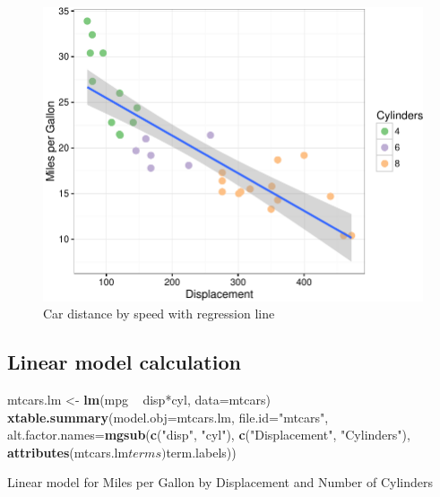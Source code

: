 \documentclass[]{article}
\newenvironment{Shaded}{\begin{snugshade}}{\end{snugshade}}
\newcommand{\KeywordTok}[1]{\textcolor[rgb]{0.13,0.29,0.53}{\textbf{{#1}}}}
\newcommand{\DataTypeTok}[1]{\textcolor[rgb]{0.13,0.29,0.53}{{#1}}}
\newcommand{\StringTok}[1]{\textcolor[rgb]{0.31,0.60,0.02}{{#1}}}
\newcommand{\NormalTok}[1]{{#1}}
\begin{document}
\begin{figure}[htbp]
\centering
\includegraphics{example_files/figure-latex/mtcars_plot-1.pdf}
\caption{Car distance by speed with regression line}
\end{figure}

\subsection{Linear model calculation}\label{linear-model-calculation}

\begin{Shaded}
\begin{Highlighting}[]
\NormalTok{mtcars.lm <-}\StringTok{ }\KeywordTok{lm}\NormalTok{(mpg ~}\StringTok{ }\NormalTok{disp*cyl, }\DataTypeTok{data=}\NormalTok{mtcars)}
\KeywordTok{xtable.summary}\NormalTok{(}\DataTypeTok{model.obj=}\NormalTok{mtcars.lm, }
               \DataTypeTok{file.id=}\StringTok{"mtcars"}\NormalTok{, }
               \DataTypeTok{alt.factor.names=}\KeywordTok{mgsub}\NormalTok{(}\KeywordTok{c}\NormalTok{(}\StringTok{"disp"}\NormalTok{, }\StringTok{"cyl"}\NormalTok{), }
                                      \KeywordTok{c}\NormalTok{(}\StringTok{"Displacement"}\NormalTok{, }\StringTok{"Cylinders"}\NormalTok{), }
                                      \KeywordTok{attributes}\NormalTok{(mtcars.lm$terms)$term.labels))}
\end{Highlighting}
\end{Shaded}

\begin{table}[h!]
\captionsetup[subtable]{labelformat=empty}
\centering
\subfloat[]{\label{tab:mtcars_lm-a}{}}\quad
\subfloat[]{\label{tab:mtcars_lm-b}{}}
\caption{Linear model for Miles per Gallon by Displacement and Number of Cylinders}
\label{tab:mtcars_lm}
\end{table}
\end{document}
